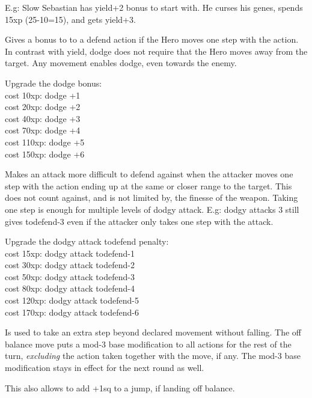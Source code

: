 E.g: Slow Sebastian has yield+2 bonus to start with. He curses his genes, spends 15xp (25-10=15), and gets yield+3.


Gives a bonus to to a defend action if the Hero moves one step with the action. In contrast with yield, dodge does not require that the Hero moves away from the target. Any movement enables dodge, even towards the enemy.

Upgrade the dodge bonus:\\
cost  10xp: dodge +1 \\
cost  20xp: dodge +2 \\
cost  40xp: dodge +3 \\
cost  70xp: dodge +4 \\
cost 110xp: dodge +5 \\
cost 150xp: dodge +6


Makes an attack more difficult to defend against when the attacker moves one step with the action ending up at the same or closer range to the target. This does not count against, and is not limited by, the finesse of the weapon. Taking one step is enough for multiple levels of dodgy attack. E.g: dodgy attacks 3 still gives todefend-3 even if the attacker only takes one step with the attack.

Upgrade the dodgy attack todefend penalty:\\
cost  15xp: dodgy attack todefend-1 \\
cost  30xp: dodgy attack todefend-2 \\
cost  50xp: dodgy attack todefend-3 \\
cost  80xp: dodgy attack todefend-4 \\
cost 120xp: dodgy attack todefend-5 \\
cost 170xp: dodgy attack todefend-6


Is used to take an extra step beyond declared movement without falling. The off balance move puts a mod-3 base modification to all actions for the rest of the turn, \emph{excluding} the action taken together with the move, if any. The mod-3 base modification stays in effect for the next round as well.

This also allows to add +1sq to a jump, if landing off balance.


